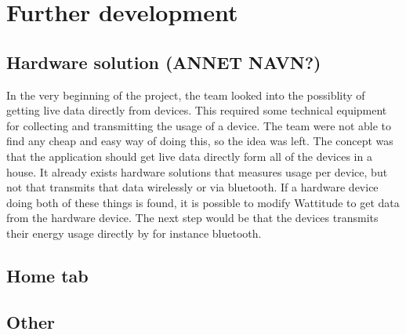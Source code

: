 \chapter{Further development}

\section{Hardware solution (ANNET NAVN?)}
In the very beginning of the project, the team looked into the possiblity of getting live data directly from devices. This required some technical equipment for collecting and transmitting the usage of a device. The team were not able to find any cheap and easy way of doing this, so the idea was left. The concept was that the application should get live data directly form all of the devices in a house. It already exists hardware solutions that measures usage per device, but not that transmits that data wirelessly or via bluetooth. If a hardware device doing both of these things is found, it is possible to modify Wattitude to get data from the hardware device. The next step would be that the devices transmits their energy usage directly by for instance bluetooth. 

\section{Home tab}

\section{Other}